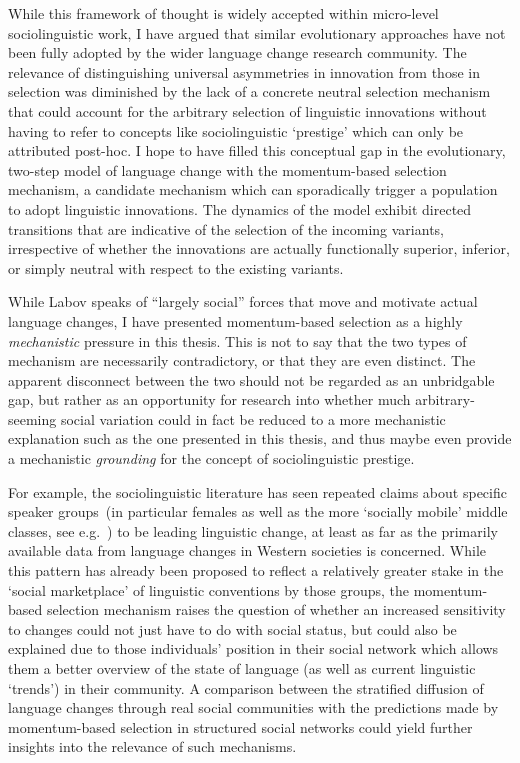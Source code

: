 While this framework of thought is widely accepted within micro-level sociolinguistic work, I have argued that similar evolutionary approaches have not been fully adopted by the wider language change research community. The relevance of distinguishing universal asymmetries in innovation from those in selection was diminished by the lack of a concrete neutral selection mechanism that could account for the arbitrary selection of linguistic innovations without having to refer to concepts like sociolinguistic `prestige' which can only be attributed post-hoc.
I hope to have filled this conceptual gap in the evolutionary, two-step model of language change with the momentum-based selection mechanism, a candidate mechanism which can sporadically trigger a population to adopt linguistic innovations. The dynamics of the model exhibit directed transitions that are indicative of the selection of the incoming variants, irrespective of whether the innovations are actually functionally superior, inferior, or simply neutral with respect to the existing variants.

While Labov speaks of ``largely social'' forces that move and motivate actual language changes, I have presented momentum-based selection as a highly \emph{mechanistic} pressure in this thesis.
This is not to say that the two types of mechanism are necessarily contradictory, or that they are even distinct.
The apparent disconnect between the two should not be regarded as an unbridgable gap, but rather as an opportunity for research into whether much arbitrary-seeming social variation could in fact be reduced to a more mechanistic explanation such as the one presented in this thesis,
and thus maybe even provide a mechanistic \emph{grounding} for the concept of sociolinguistic prestige.

For example, the sociolinguistic literature has seen repeated claims about specific speaker groups~(in particular females as well as the more `socially mobile' middle classes, see e.g.~\citealt[p.501]{Labov2001}) to be leading linguistic change, at least as far as the primarily available data from language changes in Western societies is concerned. While this pattern has already been proposed to reflect a relatively greater stake in the `social marketplace' of linguistic conventions by those groups, the momentum-based selection mechanism raises the question of whether an increased sensitivity to changes could not just have to do with social status, but could also be explained due to those individuals' position in their social network which allows them a better overview of the state of language (as well as current linguistic `trends') in their community. A comparison between the stratified diffusion of language changes through real social communities with the predictions made by momentum-based selection in structured social networks
could yield further insights into the relevance of such mechanisms.

